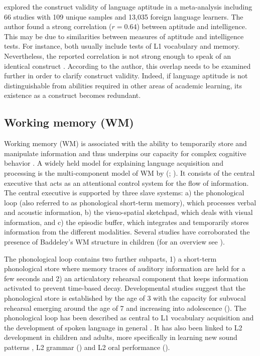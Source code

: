 \documentclass[output=paper]{langscibook}
\begin{document}
\citet{Li2016} explored the construct validity of language aptitude in a meta-ana\-ly\-sis including 66 studies with 109 unique samples and 13,035 foreign language learners. The author found a strong correlation ($r=0.64$) between aptitude and intelligence. This may be due to similarities between measures of aptitude and intelligence tests. For instance, both usually include tests of L1 vocabulary and memory. Nevertheless, the reported correlation is not strong enough to speak of an identical construct \citep{Li2016}. According to the author, this overlap needs to be examined further in order to clarify construct validity. Indeed, if language aptitude is not distinguishable from abilities required in other areas of academic learning, its existence as a construct becomes redundant. 

\subsection{Working memory (WM)} %

Working memory (WM) is associated with the ability to temporarily store and manipulate information and thus underpins our capacity for complex cognitive behavior \citep{Baddeley2003}. A widely held model for explaining language acquisition and processing is the multi-component model of WM by \citeauthor{BaddeleyHitch1974} (\citeyear{BaddeleyHitch1974}; \citealt{Baddeley2000}). It consists of the central executive that acts as an attentional control system for the flow of information. The central executive is supported by three slave systems: a) the phonological loop (also referred to as phonological short-term memory), which processes verbal and acoustic information, b) the visuo-spatial sketchpad, which deals with visual information, and c) the episodic buffer, which integrates and temporarily stores information from the different modalities. Several studies have corroborated the presence of Baddeley’s WM structure in children (for an overview see \citealt{BoyleEtAl2013}). 

The phonological loop contains two further subparts, 1) a short-term phonological store where memory traces of auditory information are held for a few seconds and 2) an articulatory rehearsal component that keeps information activated to prevent time-based decay. Developmental studies suggest that the phonological store is established by the age of 3 with the capacity for subvocal rehearsal emerging around the age of 7 and increasing into adolescence (\citealt{HasselhornGrube2003}). The phonological loop has been described as central to L1 vocabulary acquisition and the development of spoken language in general \citep{BaddeleyEtAl1998}. It has also been linked to L2 development in children and adults, more specifically in learning new sound patterns \citep{SpecialeEtAl2004}, L2 grammar (\citealt{FrenchOBrien2008}) and L2 oral performance (\citealt{OBrienEtAl2006}). 
\end{document}
